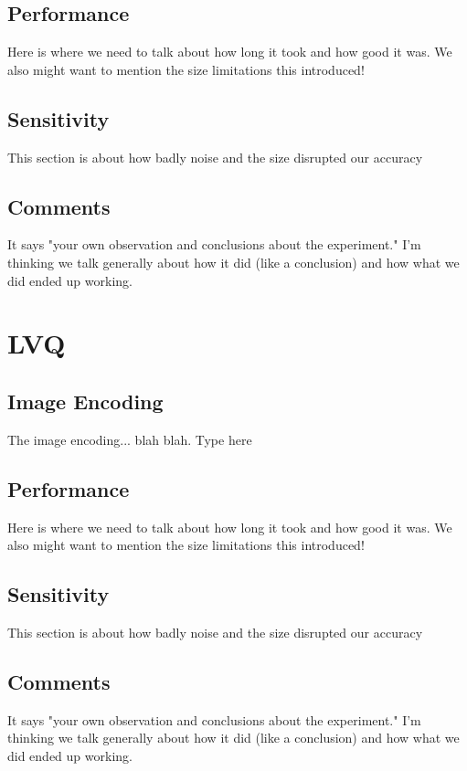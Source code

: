\documentclass{article}
\begin{document}
\subsection{Performance}
Here is where we need to talk about how long it took and how good it was. We
also might want to mention the size limitations this introduced!

\subsection{Sensitivity}
This section is about how badly noise and the size disrupted our accuracy

\subsection{Comments}
It says "your own observation and conclusions about the experiment."
I'm thinking we talk generally about how it did (like a conclusion) and how
what we did ended up working.




\section{LVQ}

\subsection{Image Encoding}
The image encoding... blah blah. Type here

\subsection{Performance}
Here is where we need to talk about how long it took and how good it was. We
also might want to mention the size limitations this introduced!

\subsection{Sensitivity}
This section is about how badly noise and the size disrupted our accuracy

\subsection{Comments}
It says "your own observation and conclusions about the experiment."
I'm thinking we talk generally about how it did (like a conclusion) and how
what we did ended up working.
\end{document}
